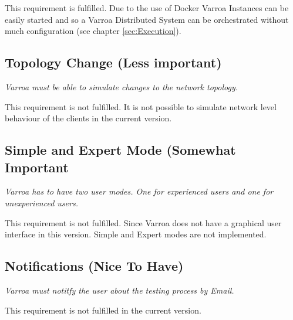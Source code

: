 This requirement is fulfilled. Due to the use of Docker Varroa Instances can be easily started and so a Varroa Distributed System can be orchestrated without much configuration (see chapter \ref{sec:Execution}).

\subsection{Topology Change (Less important)}
\emph{Varroa must be able to simulate changes to the network topology.}

This requirement is not fulfilled.
It is not possible to simulate network level behaviour of the clients in the current version.

\subsection{Simple and Expert Mode (Somewhat Important}
\emph{Varroa has to have two user modes.
One for experienced users and one for unexperienced users.}

This requirement is not fulfilled.
Since Varroa does not have a graphical user interface in this version.
Simple and Expert modes are not implemented.


\subsection{Notifications (Nice To Have)}
\emph{Varroa must notitfy the user about the testing process by Email.}

This requirement is not fulfilled in the current version.


















